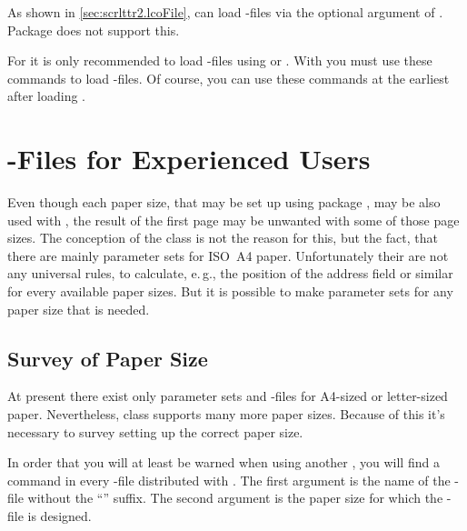 As shown in
\autoref{sec:scrlttr2.lcoFile},  can load -files via
the optional argument of . Package 
does not support this.

\begin{Declaration}
\end{Declaration}
For  it is only recommended to load -files using
 or . With 
you must use these commands to load -files. Of course, you can use
these commands at the earliest after loading .%
\EndIndexGroup
%
\EndIndexGroup


\section{-Files for Experienced Users}
\BeginIndexGroup
{}%
%

%
Even though each paper size, that may be set up using package
, may be also used with , the result of the
first page may be unwanted with some of those page sizes. The conception of
the class is not the reason for this, but the fact, that there are mainly
parameter sets for ISO~A4 paper. Unfortunately their are not any universal
rules, to calculate, e.\,g., the position of the address field or similar for
every available paper sizes. But it is possible to make parameter sets for any
paper size that is needed.%
%
%


\subsection{Survey of Paper Size}

At present there exist only parameter sets and -files for A4-sized
or letter-sized paper. Nevertheless, class  supports many more
paper sizes. Because of this it's necessary to survey setting up the correct
paper size.

\begin{Declaration}
\end{Declaration}
In order that you will at least be warned when using another , you will find a  command in every
-file distributed with {\KOMAScript}. The first argument is the name
of the -file without the ``'' suffix. The second argument
is the paper size for which the -file is designed.

